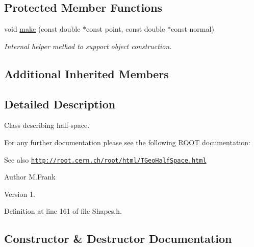 \subsection*{Protected Member Functions}
\begin{DoxyCompactItemize}
\item 
void \hyperlink{class_d_d4hep_1_1_geometry_1_1_half_space_abd2d6beb48210e1a9e29d6f16748b6dc}{make} (const double $\ast$const point, const double $\ast$const normal)
\begin{DoxyCompactList}\small\item\em Internal helper method to support object construction. \end{DoxyCompactList}\end{DoxyCompactItemize}
\subsection*{Additional Inherited Members}


\subsection{Detailed Description}
Class describing half-\/space. 

For any further documentation please see the following \hyperlink{namespace_r_o_o_t}{R\+O\+OT} documentation\+: \begin{DoxySeeAlso}{See also}
\href{http://root.cern.ch/root/html/TGeoHalfSpace.html}{\tt http\+://root.\+cern.\+ch/root/html/\+T\+Geo\+Half\+Space.\+html}
\end{DoxySeeAlso}
\begin{DoxyAuthor}{Author}
M.\+Frank 
\end{DoxyAuthor}
\begin{DoxyVersion}{Version}
1. 
\end{DoxyVersion}


Definition at line 161 of file Shapes.\+h.



\subsection{Constructor \& Destructor Documentation}
\hypertarget{class_d_d4hep_1_1_geometry_1_1_half_space_a329fa25e106b768a45aa7a63a7048727}{}\label{class_d_d4hep_1_1_geometry_1_1_half_space_a329fa25e106b768a45aa7a63a7048727} 
